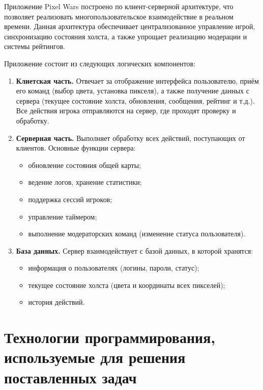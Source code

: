 \newpage
{}

Приложение Pixel Wars построено по клиент-серверной архитектуре, что позволяет реализовать многопользовательское взаимодействие в реальном времени. Данная архитектура обеспечивает централизованное управление игрой, синхронизацию состояния холста, а также упрощает реализацию модерации и системы рейтингов.

Приложение состоит из следующих логических компонентов:
\begin{enumerate}
    \item
          \textbf{Клиетская часть.} Отвечает за отображение интерфейса пользователю, приём его команд (выбор цвета, установка пикселя), а также получение данных с сервера (текущее состояние холста, обновления, сообщения,
          рейтинг и т.д.). Все действия игрока отправляются на сервер, где
          проходят проверку и обработку.

    \item
          \textbf{Серверная часть.} Выполняет обработку всех действий, поступающих от клиентов. Основные функции сервера:
          \begin{itemize}
              \item обновление состояния общей карты;
              \item ведение логов, хранение статистики;
              \item поддержка сессий игроков;
              \item управление таймером;
              \item выполнение модераторских команд (изменение статуса пользователя).
          \end{itemize}

    \item
          \textbf{База данных.} Сервер взаимодействует с базой данных, в которой хранятся:
          \begin{itemize}
              \item информация о пользователях (логины, пароли, статус);
              \item текущее состояние холста (цвета и координаты всех пикселей);
              \item история действий.
          \end{itemize}
\end{enumerate}

\newpage

\section{Технологии программирования, используемые для решения
  поставленных задач}

